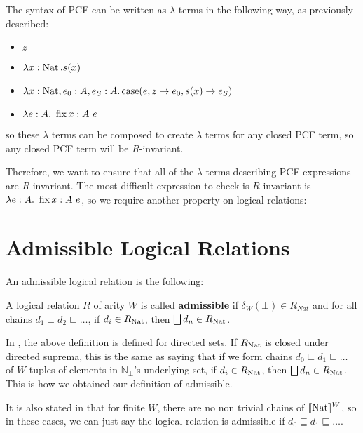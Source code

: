 The syntax of PCF can be written as $\lambda$ terms in the following way, as previously described:

\begin{itemize}
\item{$z$}
\item{$\lambda x: \operatorname{Nat}. s(x)$}
\item{$\lambda x: \operatorname{Nat}, e_0 : A, e_S: A. \operatorname{case}(e,z \to e_0,s(x) \to e_S)$}
\item{$\lambda e: A . \ \fix x:A \ e $}
\end{itemize} 


so these $\lambda$ terms can be composed to create $\lambda$ terms for any closed PCF term, so any closed PCF term will be $R$-invariant.

Therefore, we want to ensure that all of the $\lambda$ terms describing PCF expressions are $R$-invariant. The most difficult expression to check is $R$-invariant is $\lambda e: A . \ \fix x:A \ e $, so we require another property on logical relations:

\section{Admissible Logical Relations}

An admissible logical relation is the following:

\vspace{0.5cm}

\begin{defn}{\citep{Streicher06}}
A logical relation $R$ of arity $W$ is called \textbf{admissible} if $\delta_W(\bot) \in R_{Nat}$ and for all chains $d_1 \sqsubseteq d_2 \sqsubseteq \dots$, if  $d_i \in R_{\operatorname{Nat}}$, then $\bigsqcup d_n \in R_{\operatorname{Nat}}$.
\end{defn}

In \citep{Streicher06}, the above definition is defined for directed sets. If $R_{\operatorname{Nat}}$ is closed under directed suprema, this is the same as saying that if we form chains $d_0 \sqsubseteq d_1 \sqsubseteq \dots$ of $W$-tuples of elements in $\mathbb{N}_\bot$'s underlying set, if $d_i \in R_{\operatorname{Nat}}$, then $\bigsqcup d_n \in R_{\operatorname{Nat}}$. This is how we obtained our definition of admissible.

It is also stated in \citep{Streicher06} that for finite $W$, there are no non trivial chains of $\llbracket \operatorname{Nat} \rrbracket^W$, so in these cases, we can just say the logical relation is admissible if $d_0 \sqsubseteq d_1 \sqsubseteq \dots$.  

